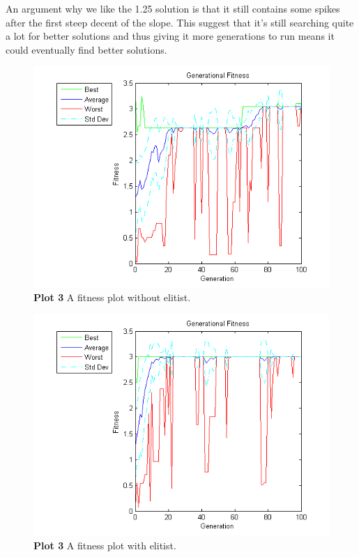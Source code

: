 \documentclass[a4paper]{article}
\begin{document}
An argument why we like the 1.25 solution is that it still contains some spikes
after the first steep decent of the slope. This suggest that it's still
searching quite a lot for better solutions and thus giving it more generations
to run means it could eventually find better solutions.


\begin{figure}[H] %
	\includegraphics[scale=0.7]{fitness-non-elitist.png}
	\caption{\label{fig:plot3nonelitist}\textbf{Plot 3} A fitness plot without elitist. }
\end{figure}
\begin{figure}[H] %
	\includegraphics[scale=0.7]{fitness-elitist.png}
	\caption{\label{fig:plot3elitist}\textbf{Plot 3} A fitness plot with elitist. }
\end{figure}
\end{document}
